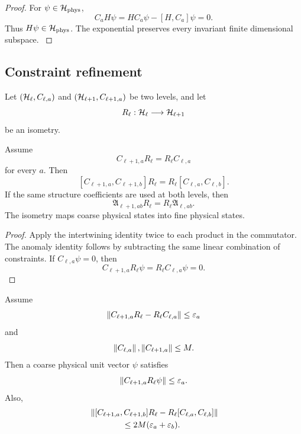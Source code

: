 \begin{proof}\label{strong:proof:070}
For \(\psi\in\Hcal_{\phys}\),
\[
C_aH\psi
=HC_a\psi-[H,C_a]\psi
=0.
\]
Thus \(H\psi\in\Hcal_{\phys}\). The exponential preserves every invariant finite dimensional subspace.
\label{strong:proof:070:end}\end{proof}

\subsection{Constraint refinement}\label{strong:subsec:constraint_refinement}

Let \((\Hcal_\ell,C_{\ell,a})\) and \((\Hcal_{\ell+1},C_{\ell+1,a})\) be two levels, and let
\[
R_\ell:\Hcal_\ell\longrightarrow\Hcal_{\ell+1}
\]
be an isometry.

\begin{theorem}\label{strong:theorem:044}\label{strong:thm:constraint_transport}
Assume
\[
C_{\ell+1,a}R_\ell=R_\ell C_{\ell,a}
\]
for every \(a\). Then
\[
[C_{\ell+1,a},C_{\ell+1,b}]R_\ell
=
R_\ell[C_{\ell,a},C_{\ell,b}].
\]
If the same structure coefficients are used at both levels, then
\[
\mathfrak A_{\ell+1,ab}R_\ell
=
R_\ell\mathfrak A_{\ell,ab}.
\]
The isometry maps coarse physical states into fine physical states.
\end{theorem}

\begin{proof}\label{strong:proof:071}
Apply the intertwining identity twice to each product in the commutator. The anomaly identity follows by subtracting the same linear combination of constraints. If \(C_{\ell,a}\psi=0\), then
\[
C_{\ell+1,a}R_\ell\psi=R_\ell C_{\ell,a}\psi=0.
\]
\label{strong:proof:071:end}\end{proof}

\begin{proposition}\label{strong:proposition:012}\label{strong:prop:approx_constraint_transport}
Assume
\[
\left\lVert C_{\ell+1,a}R_\ell-R_\ell C_{\ell,a}\right\rVert
\leq\varepsilon_a
\]
and
\[
\left\lVert C_{\ell,a}\right\rVert,\left\lVert C_{\ell+1,a}\right\rVert\leq M.
\]
Then a coarse physical unit vector \(\psi\) satisfies
\[
\left\lVert C_{\ell+1,a}R_\ell\psi\right\rVert\leq\varepsilon_a.
\]
Also,
\[
\begin{aligned}
&\left\lVert
[C_{\ell+1,a},C_{\ell+1,b}]R_\ell
-R_\ell[C_{\ell,a},C_{\ell,b}]
\right\rVert\\
&\hspace{4em}\leq
2M(\varepsilon_a+\varepsilon_b).
\end{aligned}
\]
\end{proposition}

